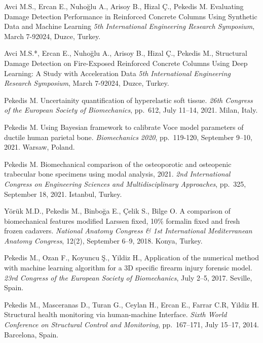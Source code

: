 \documentclass[10pt]{article}
\begin{document}
\begin{bibenum}

	\item Avci M.S., Ercan E., Nuhoğlu A., Arisoy B., Hizal Ç., Pekedis M. Evaluating Damage 		Detection Performance in Reinforced Concrete Columns Using Synthetic Data and Machine 			Learning
	\emph{5th International Engineering Research Symposium}, March 7-92024, Duzce, Turkey.
		

	\item Avci M.S.*, Ercan E., Nuhoğlu A., Arisoy B., Hizal Ç., Pekedis M., Structural Damage 		Detection on Fire-Exposed Reinforced Concrete Columns Using Deep Learning: A Study with 		Acceleration Data
	\emph{5th International Engineering Research Symposium}, March 7-92024, Duzce, Turkey.


	\item Pekedis M. Uncertainity quantification of hyperelastic soft tissue.  
		\emph{26th Congress of the European Society of Biomechanics}, pp.~612, July 11--14, 2021. Milan, Italy.

	\item Pekedis M. Using Bayesian framework to calibrate Voce model parameters of ductile human parietal bone. 
		\emph{Biomechanics 2020}, pp.~119-120, September 9--10, 2021. Warsaw, Poland.

	\item Pekedis M. Biomechanical comparison of the osteoporotic and osteopenic trabecular bone specimens using 
		modal analysis, 2021.
		\emph{2nd International Congress on Engineering Sciences and Multidisciplinary Approaches}, pp.~325, 
		September 18, 2021. Istanbul, Turkey.
	
	\item Yörük M.D., Pekedis M., Binboğa E., Çelik S., Bilge O. A comparison of biomechanical features modified Larssen 
		fixed, 10\% formalin fixed and fresh frozen cadavers.
		\emph{National Anatomy Congress & 1st International Mediterranean Anatomy Congress}, 12(2),
		September 6--9, 2018. Konya, Turkey.

		
	\item Pekedis M., Ozan F., Koyuncu Ş., Yildiz H., Application of the numerical method with machine learning algorithm 
		for a 3D specific firearm injury forensic model. 
		\emph{23rd Congress of the European Society of Biomechanics}, July 2--5, 2017. Seville, Spain. 
		
	\item Pekedis M., Masceranas D., Turan G., Ceylan H., Ercan E., Farrar C.R, Yildiz H. Structural health monitoring via 
		human-machine Interface. \emph{Sixth World Conference on Structural Control and Monitoring},
		pp.~167--171, July 15--17, 2014. Barcelona, Spain.


\end{bibenum}
\end{document}

